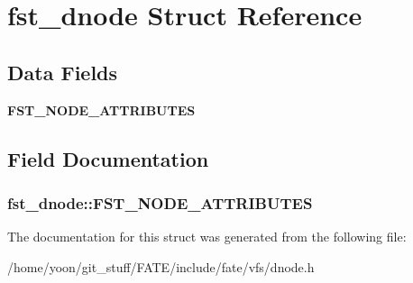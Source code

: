 \hypertarget{structfst__dnode}{\section{fst\-\_\-dnode Struct Reference}
\label{structfst__dnode}
}
\subsection*{Data Fields}
\begin{DoxyCompactItemize}
\item 
\hypertarget{structfst__dnode_ad26b646446bdf496cec6ac7ca25bf764}{{\bfseries F\-S\-T\-\_\-\-N\-O\-D\-E\-\_\-\-A\-T\-T\-R\-I\-B\-U\-T\-E\-S}}\label{structfst__dnode_ad26b646446bdf496cec6ac7ca25bf764}

\end{DoxyCompactItemize}


\subsection{Field Documentation}
\hypertarget{structfst__dnode_ad26b646446bdf496cec6ac7ca25bf764}{
\subsubsection[{F\-S\-T\-\_\-\-N\-O\-D\-E\-\_\-\-A\-T\-T\-R\-I\-B\-U\-T\-E\-S}]{\setlength{\rightskip}{0pt plus 5cm}fst\-\_\-dnode\-::\-F\-S\-T\-\_\-\-N\-O\-D\-E\-\_\-\-A\-T\-T\-R\-I\-B\-U\-T\-E\-S}}\label{structfst__dnode_ad26b646446bdf496cec6ac7ca25bf764}


The documentation for this struct was generated from the following file\-:\begin{DoxyCompactItemize}
\item 
/home/yoon/git\-\_\-stuff/\-F\-A\-T\-E/include/fate/vfs/dnode.\-h\end{DoxyCompactItemize}
